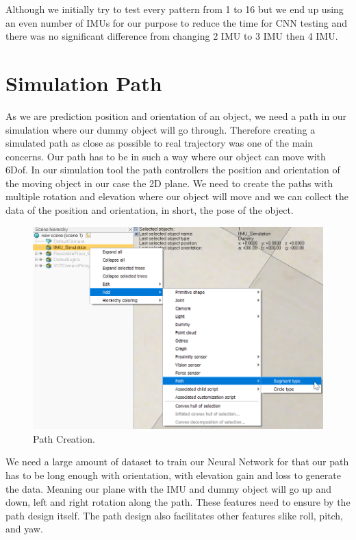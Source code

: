 Although we initially try to test every pattern from 1 to 16 but we end up using an even number of IMUs for our purpose to reduce the time for CNN testing and there was no significant difference from changing 2 IMU to 3 IMU then 4 IMU. 


\section{Simulation Path}

As we are prediction position and orientation of an object, we need a path in our simulation where our dummy object will go through. Therefore creating a simulated path as close as possible to real trajectory was one of the main concerns. Our path has to be in such a way where our object can move with 6Dof. In our simulation tool the path controllers the position and orientation of the moving object in our case the 2D plane. We need to create the paths with multiple rotation and elevation where our object will move and we can collect the data of the position and orientation, in short, the pose of the object.

\begin{figure}[h]
  \centering
    \includegraphics[width=\linewidth]{figures/pathCreation.png}
    \caption{Path Creation.}
\label{fig:Path_creation}
\end{figure}


We need a large amount of dataset to train our Neural Network for that our path has to be long enough with orientation, with elevation gain and loss to generate the data. Meaning our plane with the IMU and dummy object will go up and down, left and right rotation along the path. These features need to ensure by the path design itself. The path design also facilitates other features slike roll, pitch, and yaw. 

